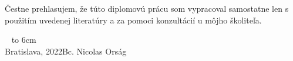 \documentclass[12pt, a4paper, oneside]{book}
\newcommand\mfauthor{Bc. Nicolas Orság}
\newcommand\mfplacedate{Bratislava, 2022}
\begin{document}
\thispagestyle{empty}


\begin{figure}[H]
\begin{center}
\label{img:zadanie}
\end{center}
\end{figure}

{~}\vspace{12cm}

\noindent
\begin{minipage}{0.25\textwidth}~\end{minipage}
\begin{minipage}{0.75\textwidth}
Čestne prehlasujem, že túto diplomovú prácu som vypracoval samostatne len s použitím uvedenej literatúry a za pomoci konzultácií u môjho školiteľa.
\newline \newline
\end{minipage}
\vfill
~ \hfill {\hbox to 6cm{\dotfill}} \\
\mfplacedate \hfill \mfauthor
\vfill\eject 
\end{document}
